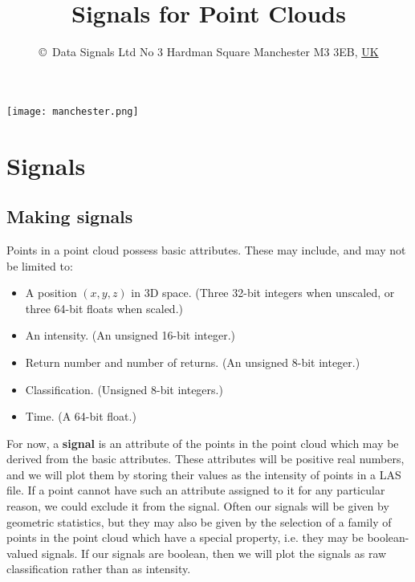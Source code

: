 \documentclass[a4paper,11pt,twoside]{article}
\theoremstyle{definition}
\theoremstyle{remark}
\begin{document}
\title{\textbf{Signals for Point Clouds}}
\author{\copyright\ Data Signals Ltd No 3 Hardman Square Manchester M3 3EB, \underline{UK}
}
\date{}
\maketitle
\texttt{[image: manchester.png]}
\newpage
\tableofcontents
\lstset{language=Python, 
        basicstyle=\ttfamily\small, 
        breaklines = true
}
\newpage
\section{Signals} 
\subsection{Making signals}
Points in a point cloud possess basic attributes. These may include, and may not be limited to:
\begin{itemize}
\item A position $(x,y,z)$ in 3D space. (Three 32-bit integers when unscaled, or three 64-bit floats when scaled.)
\item An intensity. (An unsigned 16-bit integer.)
\item Return number and number of returns. (An unsigned 8-bit integer.)
\item Classification. (Unsigned 8-bit integers.)
\item Time. (A 64-bit float.)
\end{itemize}
For now, a \textbf{signal} is an attribute of the points in the point cloud which may be derived from the basic attributes. These attributes will be positive real numbers, and we will plot them by storing their values as the intensity of points in a LAS file. If a point cannot have such an attribute assigned to it for any particular reason, we could exclude it from the signal. Often our signals will be given by geometric statistics, but they may also be given by the selection of a family of points in the point cloud which have a special property, i.e. they may be boolean-valued signals. If our signals are boolean, then we will plot the signals as raw classification rather than as intensity.
\end{document}
